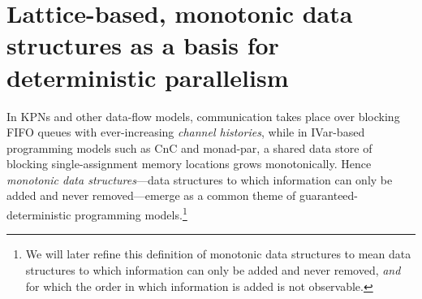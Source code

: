 \section{Lattice-based, monotonic data structures as a basis for deterministic parallelism}\label{s:intro-monotonic}

In KPNs and other data-flow models, communication takes place over
blocking FIFO queues with ever-increasing \emph{channel histories},
while in IVar-based programming models such as CnC and monad-par, a
shared data store of blocking single-assignment memory locations grows
monotonically.  Hence \emph{monotonic data structures}---data
structures to which information can only be added and never
removed---emerge as a common theme of guaranteed-deterministic
programming models.\footnote{We will later refine this definition of
  monotonic data structures to mean data structures to which
  information can only be added and never removed, \emph{and} for
  which the order in which information is added is not
  observable.}

